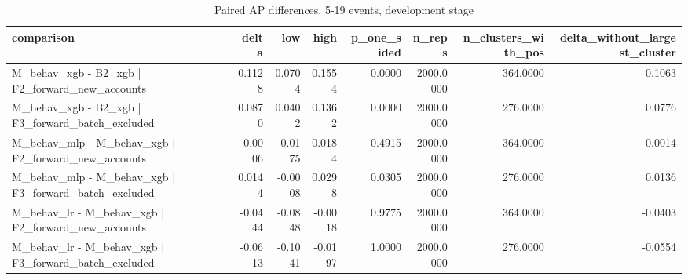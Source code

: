 \begin{table}
\caption{Paired AP differences, 5-19 events, development stage}
\label{tab:tab_model_decisions_dev}
\begin{tabular}{lrrrrrrr}
\toprule
comparison & delta & low & high & p\_one\_sided & n\_reps & n\_clusters\_with\_pos & delta\_without\_largest\_cluster \\
\midrule
M\_behav\_xgb - B2\_xgb | F2\_forward\_new\_accounts & 0.1128 & 0.0704 & 0.1554 & 0.0000 & 2000.0000 & 364.0000 & 0.1063 \\
M\_behav\_xgb - B2\_xgb | F3\_forward\_batch\_excluded & 0.0870 & 0.0402 & 0.1362 & 0.0000 & 2000.0000 & 276.0000 & 0.0776 \\
M\_behav\_mlp - M\_behav\_xgb | F2\_forward\_new\_accounts & -0.0006 & -0.0175 & 0.0184 & 0.4915 & 2000.0000 & 364.0000 & -0.0014 \\
M\_behav\_mlp - M\_behav\_xgb | F3\_forward\_batch\_excluded & 0.0144 & -0.0008 & 0.0298 & 0.0305 & 2000.0000 & 276.0000 & 0.0136 \\
M\_behav\_lr - M\_behav\_xgb | F2\_forward\_new\_accounts & -0.0444 & -0.0848 & -0.0018 & 0.9775 & 2000.0000 & 364.0000 & -0.0403 \\
M\_behav\_lr - M\_behav\_xgb | F3\_forward\_batch\_excluded & -0.0613 & -0.1041 & -0.0197 & 1.0000 & 2000.0000 & 276.0000 & -0.0554 \\
\bottomrule
\end{tabular}
\end{table}
